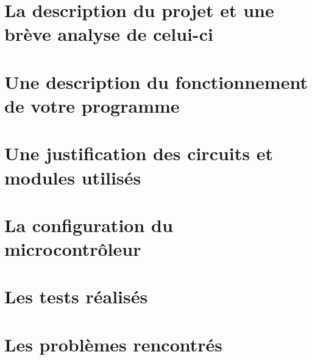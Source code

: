 \documentclass{article}
\begin{document}
    \section{La description du projet et une brève analyse de celui-ci}
    \section{Une description du fonctionnement de votre programme}
    \section{Une justification des circuits et modules utilisés}
    \section{La configuration du microcontrôleur}
    \section{Les tests réalisés}
    \section{Les problèmes rencontrés}
    
\end{document}
